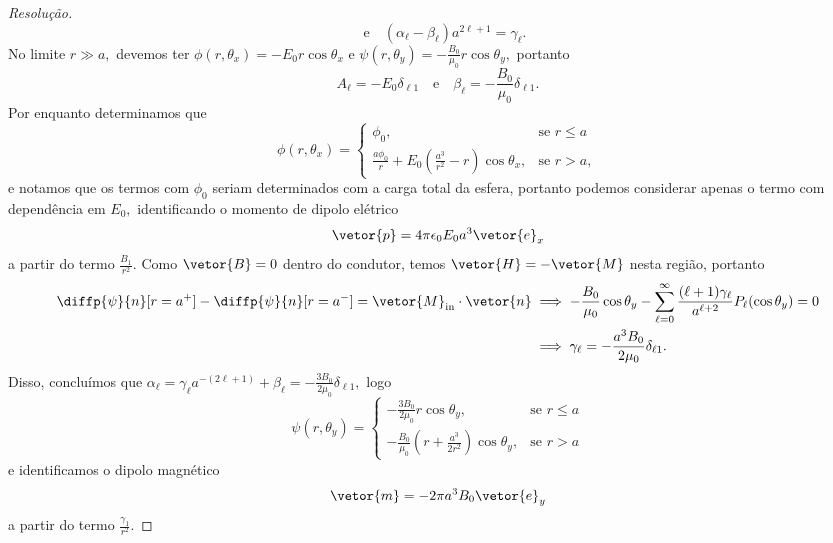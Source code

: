 \begin{proof}[Resolução]
\begin{equation*}
      \quad\text{e}\quad
      (\alpha_\ell - \beta_\ell )a^{2\ell + 1} = \gamma_\ell.
   \end{equation*}
   No limite \(r \gg a,\) devemos ter \(\phi(r, \theta_x) = -E_0r\cos\theta_x\) e \(\psi(r,\theta_y) = - \frac{B_0}{\mu_0} r\cos\theta_y,\) portanto 
   \begin{equation*}
      A_\ell = -E_0\delta_{\ell 1}
      \quad\text{e}\quad
      \beta_\ell = - \frac{B_0}{\mu_0} \delta_{\ell 1}.
   \end{equation*}
   Por enquanto determinamos que
   \begin{equation*}
      \phi(r,\theta_x) = \begin{cases}
         \phi_0,&\text{se }r \leq a\\
         \frac{a\phi_0}{r} + E_0\left(\frac{a^3}{r^2} - r\right)\cos\theta_x,&\text{se }r > a,
      \end{cases}
   \end{equation*}
   e notamos que os termos com \(\phi_0\) seriam determinados com a carga total da esfera, portanto podemos considerar apenas o termo com dependência em \(E_0,\) identificando o momento de dipolo elétrico
   \begin{equation*}
      \vetor{p} = 4\pi \epsilon_0 E_0 a^3 \vetor{e}_x
   \end{equation*}
   a partir do termo \(\frac{B_1}{r^2}.\) Como \(\vetor{B} = 0\) dentro do condutor, temos \(\vetor{H} = -\vetor{M}\) nesta região, portanto
   \begin{align*}
      \diffp{\psi}{n}[r =  a^+] - \diffp{\psi}{n}[r = a^-] = \vetor{M}_\mathrm{in} \cdot \vetor{n} 
      &\implies -\frac{B_0}{\mu_0}\cos\theta_y - \sum_{\ell = 0}^\infty \frac{(\ell + 1) \gamma_\ell}{a^{\ell + 2}}P_\ell(\cos\theta_y) = 0\\
      &\implies \gamma_\ell = -\frac{a^3 B_0}{2\mu_0} \delta_{\ell 1}.
   \end{align*}
   Disso, concluímos que \(\alpha_\ell = \gamma_\ell a^{-(2\ell + 1)}+ \beta_\ell = -\frac{3B_0}{2\mu_0}\delta_{\ell 1},\) logo
   \begin{equation*}
       \psi(r, \theta_y) = \begin{cases}
          -\frac{3 B_0}{2 \mu_0} r\cos\theta_y,&\text{se }r \leq a\\
          -\frac{B_0}{\mu_0}\left(r + \frac{a^3}{2 r^2}\right)\cos\theta_y,&\text{se }r > a
       \end{cases}
   \end{equation*}
   e identificamos o dipolo magnético
   \begin{equation*}
      \vetor{m} = - 2\pi a^3 B_0 \vetor{e}_y
   \end{equation*}
   a partir do termo \(\frac{\gamma_1}{r^2}.\)


\end{proof}
